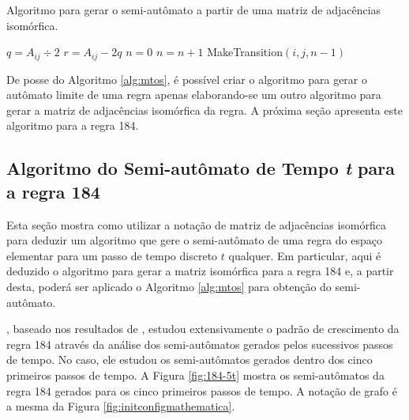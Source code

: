 \documentclass[12pt,a4paper]{article}
\begin{document}
\begin{algorithm}
\caption{Algoritmo para gerar o semi-autômato a partir de uma matriz de
adjacências isomórfica.}
\label{alg:mtos}
\begin{algorithmic}
\REPEAT
\STATE $q = A_{ij} \div 2$
\STATE $r = A_{ij}-2q$ 
\STATE $n=0$
\STATE $n=n+1$
\ENDWHILE
\STATE MakeTransition$(i,j,n-1)$
\ENDIF
{}
\ENDIF
\ENDFOR
\ENDFOR
\end{algorithmic}
\end{algorithm}

De posse do Algoritmo \ref{alg:mtos}, é possível criar o algoritmo para gerar o
autômato limite de uma regra apenas elaborando-se um outro algoritmo para gerar a
matriz de adjacências isomórfica da regra. A próxima seção apresenta este
algoritmo para a regra 184.

\subsection{Algoritmo do Semi-autômato de Tempo \emph{t} para a regra 184}\label{sec:184}

Esta seção mostra como utilizar a notação de matriz de adjacências
isomórfica para deduzir um algoritmo que gere o semi-autômato de uma
regra do espaço elementar para um passo de tempo discreto $t$ qualquer. Em
particular, aqui é deduzido o algoritmo para gerar a matriz isomórfica para
a regra 184 e, a partir desta, poderá ser aplicado o Algoritmo \ref{alg:mtos}
para obtenção do semi-autômato.

, baseado nos resultados de ,
estudou extensivamente o padrão de crescimento da regra 184 através da análise
dos semi-autômatos gerados pelos sucessivos passos de tempo. No caso, ele estudou
os semi-autômatos gerados dentro dos cinco primeiros passos de tempo. A Figura
\ref{fig:184-5t} mostra os semi-autômatos da regra 184 gerados para os cinco
primeiros passos de tempo. A notação de grafo é a mesma da Figura
\ref{fig:initconfigmathematica}.
\end{document}
